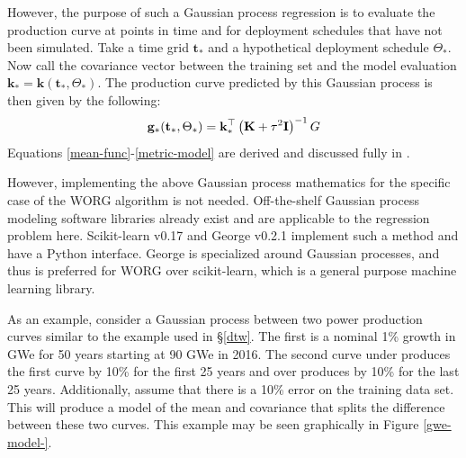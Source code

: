 However, the purpose of such a Gaussian process regression is to evaluate 
the production curve at points in time and for deployment schedules that 
have not been simulated. Take a time grid $\mathbf{t_*}$ and a hypothetical
deployment schedule $\Theta_*$. Now call the covariance vector between
the training set and the model evaluation    
$\mathbf{k}_* = \mathbf{k}(\mathbf{t_*}, \Theta_*)$. 
The production curve predicted by this Gaussian process is then given by
the following:
\begin{equation}
\label{metric-model}
\mathbf{g}_*(\mathbf{t}_*, \Theta_*) = 
    \mathbf{k}_*^\top \left(\mathbf{K} + \tau^2\mathbf{I}\right)^{-1}G
\end{equation}
Equations \ref{mean-func}-\ref{metric-model} are derived and discussed fully
in \cite{rasmussen2006gaussian}. 

However, implementing the above Gaussian process mathematics for the specific
case of the WORG algorithm 
is not needed.  Off-the-shelf Gaussian process modeling software 
libraries already exist and are applicable to the regression problem here.
Scikit-learn v0.17 \cite{scikit-learn} and George v0.2.1 \cite{hodlr} 
implement such a method and have a Python interface. George is specialized 
around Gaussian processes, and thus is preferred for WORG over scikit-learn, 
which is a general purpose machine learning library.

As an example, consider a Gaussian process between two power production 
curves similar to the example used in \S\ref{dtw}. The first is a nominal 1\% growth 
in GWe for 50 years starting at 
90 GWe in 2016. The second curve under produces the first curve by 10\% 
for the first 25 years and over produces by 10\% for the last 25 years.
Additionally, assume that there is a 10\% error on the training data set.
This will produce a model of the mean and covariance that splits the 
difference between these two curves. This example may be seen graphically
in Figure \ref{gwe-model-}.

